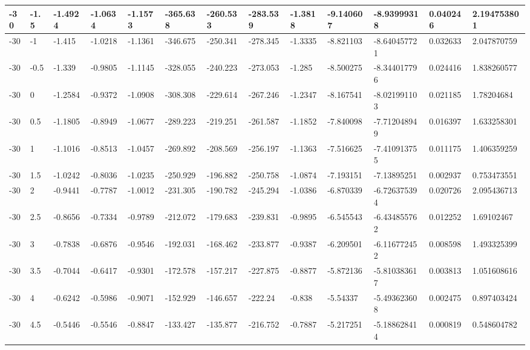 \begin{longtable}{|l|l|l|l|l|l|l|l|l|l|l|l|l|}
-30   & -1.5  & -1.4924 & -1.0634 & -1.1573 & -365.638 & -260.533 & -283.539 & -1.3818  & -9.140607   & -8.93999318    & 0.040246                 & 2.194753801 \\ \hline
-30   & -1    & -1.415  & -1.0218 & -1.1361 & -346.675 & -250.341 & -278.345 & -1.3335  & -8.821103   & -8.640457721   & 0.032633                 & 2.047870759 \\ \hline
-30   & -0.5  & -1.339  & -0.9805 & -1.1145 & -328.055 & -240.223 & -273.053 & -1.285   & -8.500275   & -8.344017796   & 0.024416                 & 1.838260577 \\ \hline
-30   & 0     & -1.2584 & -0.9372 & -1.0908 & -308.308 & -229.614 & -267.246 & -1.2347  & -8.167541   & -8.021991103   & 0.021185                 & 1.78204684  \\ \hline
-30   & 0.5   & -1.1805 & -0.8949 & -1.0677 & -289.223 & -219.251 & -261.587 & -1.1852  & -7.840098   & -7.712048949   & 0.016397                 & 1.633258301 \\ \hline
-30   & 1     & -1.1016 & -0.8513 & -1.0457 & -269.892 & -208.569 & -256.197 & -1.1363  & -7.516625   & -7.410913755   & 0.011175                 & 1.406359259 \\ \hline
-30   & 1.5   & -1.0242 & -0.8036 & -1.0235 & -250.929 & -196.882 & -250.758 & -1.0874  & -7.193151   & -7.13895251    & 0.002937                 & 0.753473551 \\ \hline
-30   & 2     & -0.9441 & -0.7787 & -1.0012 & -231.305 & -190.782 & -245.294 & -1.0386  & -6.870339   & -6.726375394   & 0.020726                 & 2.095436713 \\ \hline
-30   & 2.5   & -0.8656 & -0.7334 & -0.9789 & -212.072 & -179.683 & -239.831 & -0.9895  & -6.545543   & -6.434855762   & 0.012252                 & 1.69102467  \\ \hline
-30   & 3     & -0.7838 & -0.6876 & -0.9546 & -192.031 & -168.462 & -233.877 & -0.9387  & -6.209501   & -6.116772452   & 0.008598                 & 1.493325399 \\ \hline
-30   & 3.5   & -0.7044 & -0.6417 & -0.9301 & -172.578 & -157.217 & -227.875 & -0.8877  & -5.872136   & -5.810383617   & 0.003813                 & 1.051608616 \\ \hline
-30   & 4     & -0.6242 & -0.5986 & -0.9071 & -152.929 & -146.657 & -222.24  & -0.838   & -5.54337    & -5.493623608   & 0.002475                 & 0.897403424 \\ \hline
-30   & 4.5   & -0.5446 & -0.5546 & -0.8847 & -133.427 & -135.877 & -216.752 & -0.7887  & -5.217251   & -5.188628414   & 0.000819                 & 0.548604782 \\ \hline

\end{longtable}
